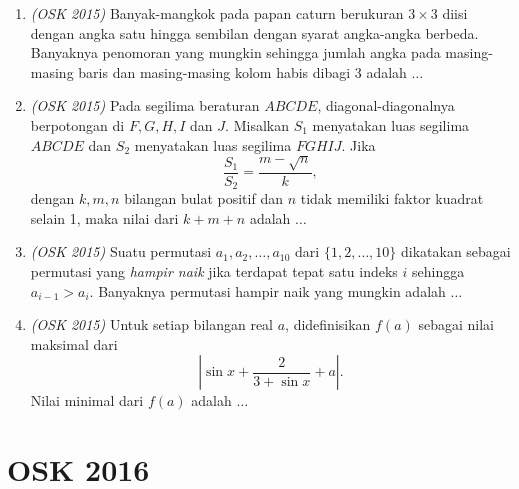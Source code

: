\begin{enumerate}
	\item \textit{(OSK 2015)} Banyak-mangkok pada papan caturn berukuran $3\times 3$ diisi dengan angka satu hingga sembilan dengan syarat angka-angka berbeda. Banyaknya penomoran yang mungkin sehingga jumlah angka pada masing-masing baris dan masing-masing kolom habis dibagi 3 adalah $\dots$
	
	\item \textit{(OSK 2015)} Pada segilima beraturan $ABCDE$, diagonal-diagonalnya berpotongan di $F,G,H,I$ dan $J$. Misalkan $S_1$ menyatakan luas segilima $ABCDE$ dan $S_2$ menyatakan luas segilima $FGHIJ$. Jika
	\[
	\frac{S_1}{S_2} = \frac{m - \sqrt{n}}{k},
	\]
	dengan $k,m,n$ bilangan bulat positif dan $n$ tidak memiliki faktor kuadrat selain 1, maka nilai dari $k + m + n$ adalah $\dots$
	
	\item \textit{(OSK 2015)} Suatu permutasi $a_1,a_2,\ldots,a_{10}$ dari $\{1,2,\ldots,10\}$ dikatakan sebagai permutasi yang \emph{hampir naik} jika terdapat tepat satu indeks $i$ sehingga $a_{i-1}>a_i$. Banyaknya permutasi hampir naik yang mungkin adalah $\dots$
	
	\item \textit{(OSK 2015)} Untuk setiap bilangan real $a$, didefinisikan $f(a)$ sebagai nilai maksimal dari
	\[
	\left|\sin x + \frac{2}{3+\sin x} + a\right|.
	\]
	Nilai minimal dari $f(a)$ adalah $\dots$
	
\end{enumerate}


\newpage
\section{OSK 2016}

